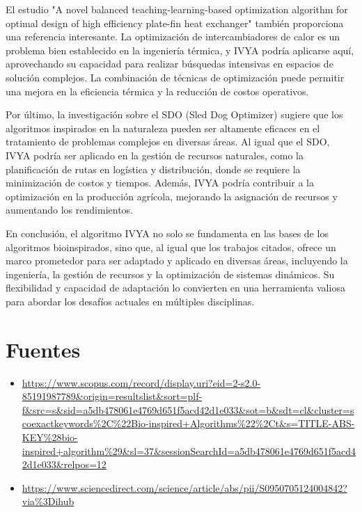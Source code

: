 El estudio "A novel balanced teaching-learning-based optimization algorithm for
optimal design of high efficiency plate-fin heat exchanger" también proporciona
una referencia interesante. La optimización de intercambiadores de calor es un
problema bien establecido en la ingeniería térmica, y IVYA podría aplicarse
aquí, aprovechando su capacidad para realizar búsquedas intensivas en espacios
de solución complejos. La combinación de técnicas de optimización puede
permitir una mejora en la eficiencia térmica y la reducción de costos
operativos.

Por último, la investigación sobre el SDO (Sled Dog Optimizer) sugiere que los
algoritmos inspirados en la naturaleza pueden ser altamente eficaces en el
tratamiento de problemas complejos en diversas áreas. Al igual que el SDO, IVYA
podría ser aplicado en la gestión de recursos naturales, como la planificación
de rutas en logística y distribución, donde se requiere la minimización de
costos y tiempos. Además, IVYA podría contribuir a la optimización en la
producción agrícola, mejorando la asignación de recursos y aumentando los
rendimientos.

En conclusión, el algoritmo IVYA no solo se fundamenta en las bases de los
algoritmos bioinspirados, sino que, al igual que los trabajos citados, ofrece
un marco prometedor para ser adaptado y aplicado en diversas áreas, incluyendo
la ingeniería, la gestión de recursos y la optimización de sistemas dinámicos.
Su flexibilidad y capacidad de adaptación lo convierten en una herramienta
valiosa para abordar los desafíos actuales en múltiples disciplinas.

\section*{Fuentes}
\label{sec:fuentes}

\begin{itemize}
    \item \url{https://www.scopus.com/record/display.uri?eid=2-s2.0-85191987789&origin=resultslist&sort=plf-f&src=s&sid=a5db478061e4769d651f5acd42d1e033&sot=b&sdt=cl&cluster=scoexactkeywords%2C%22Bio-inspired+Algorithms%22%2Ct&s=TITLE-ABS-KEY%28bio-inspired+algorithm%29&sl=37&sessionSearchId=a5db478061e4769d651f5acd42d1e033&relpos=12}
    \item \url{https://www.sciencedirect.com/science/article/abs/pii/S0950705124004842?via%3Dihub}
\end{itemize}

